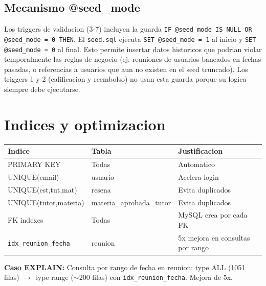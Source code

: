 \documentclass[10pt,a4paper]{article}
\begin{document}
\subsection{Mecanismo @seed\_mode}
Los triggers de validacion (3-7) incluyen la guarda \texttt{IF @seed\_mode IS NULL OR @seed\_mode = 0 THEN}. El \texttt{seed.sql} ejecuta \texttt{SET @seed\_mode = 1} al inicio y \texttt{SET @seed\_mode = 0} al final. Esto permite insertar datos historicos que podrian violar temporalmente las reglas de negocio (ej: reuniones de usuarios baneados en fechas pasadas, o referencias a usuarios que aun no existen en el seed truncado). Los triggers 1 y 2 (calificacion y reembolso) no usan esta guarda porque su logica siempre debe ejecutarse.

\section{Indices y optimizacion}
\begin{longtable}{llp{7cm}}
\toprule
\textbf{Indice} & \textbf{Tabla} & \textbf{Justificacion} \\
\midrule
PRIMARY KEY & Todas & Automatico \\
UNIQUE(email) & usuario & Acelera login \\
UNIQUE(est,tut,mat) & resena & Evita duplicados \\
UNIQUE(tutor,materia) & materia\_aprobada\_tutor & Evita duplicados \\
FK indexes & Todas & MySQL crea por cada FK \\
\texttt{idx\_reunion\_fecha} & reunion & 5x mejora en consultas por rango \\
\bottomrule
\end{longtable}

\textbf{Caso EXPLAIN:} Consulta por rango de fecha en reunion: type ALL (1051 filas) $\rightarrow$ type range ($\sim$200 filas) con \texttt{idx\_reunion\_fecha}. Mejora de 5x.

\end{document}
